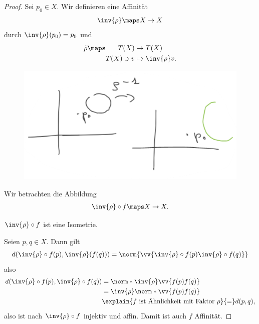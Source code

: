 \begin{proof}
  Sei \( p_0\in X \). Wir definieren eine Affinität
  \begin{equation*}
    \inv{\rho}\maps X\to X
  \end{equation*}
  durch \( \inv{\rho}(p_0)=p_0 \) und
  \begin{equation*}
    \tilde{\rho}\maps \begin{aligned}[t]
      T(X)&\to T(X)\\
      T(X)\ni v&\mapsto \inv{\rho}v.
    \end{aligned}
  \end{equation*}
  \begin{figure}[H]
    \centering
    \includegraphics[width=0.5\linewidth]{figures/aehnlichkeiten_sind_affinitaeten_beweis}
    \label{fig:aehnlichkeiten_sind_affinitaeten_beweis}
  \end{figure}
  Wir betrachten die Abbildung
  \begin{equation*}
    \inv{\rho}\circ f\maps X\to X.
  \end{equation*}
  \begin{behauptung*}
    \( \inv{\rho}\circ f \) ist eine Isometrie.
  \end{behauptung*}
  Seien \( p,q\in X \). Dann gilt
  \begin{equation*}
    d(\inv{\rho}\circ f(p),\inv{\rho}(f(q)))=\norm{\vv{\inv{\rho}\circ f(p) \inv{\rho}\circ f(q)}}
  \end{equation*}
  also
  \begin{align*}
    d(\inv{\rho}\circ f(p),\inv{\rho}\circ f(q))&=\norm*{\inv{\rho}\vv{f(p)f(q)}}\\
    &=\inv{\rho}\norm*{\vv{f(p)f(q)}}\\
    &\explain{\text{\( f \) ist Ähnlichkeit mit Faktor \( \rho \)}}{=}d(p,q),
  \end{align*}
  also ist nach  \( \inv{\rho}\circ f \) injektiv und affin. Damit ist auch \( f \) Affinität.
\end{proof}